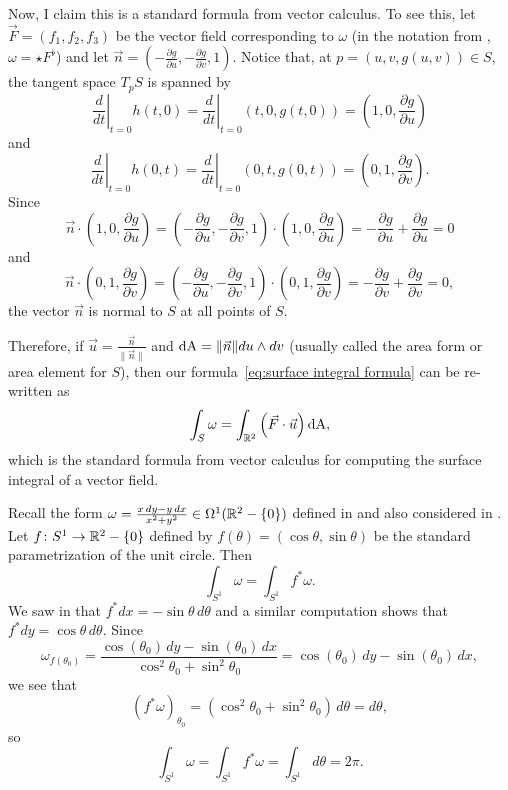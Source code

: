 \begin{example}
	Now, I claim this is a standard formula from vector calculus. To see this, let $\vec{F} = (f_1, f_2, f_3)$ be the vector field corresponding to $\omega$ (in the notation from , $\omega = \star F^\flat$) and let $\vec{n} = \left( -\frac{\partial g}{\partial u}, -\frac{\partial g}{\partial v}, 1\right)$. Notice that, at $p = (u,v,g(u,v)) \in S$, the tangent space $T_pS$ is spanned by
	\[
		\left. \frac{d}{dt} \right|_{t=0} h(t,0) = \left. \frac{d}{dt} \right|_{t=0} (t,0,g(t,0)) = \left( 1, 0 , \frac{\partial g}{\partial u} \right)
	\]
	and
	\[
		\left. \frac{d}{dt} \right|_{t=0} h(0,t) = \left. \frac{d}{dt} \right|_{t=0} (0,t,g(0,t)) = \left( 0,1 , \frac{\partial g}{\partial v} \right).
	\]
	Since
	\[
		\vec{n} \cdot \left( 1, 0 , \frac{\partial g}{\partial u} \right) = \left( -\frac{\partial g}{\partial u}, -\frac{\partial g}{\partial v}, 1\right) \cdot \left( 1, 0 , \frac{\partial g}{\partial u} \right) = -\frac{\partial g}{\partial u} + \frac{\partial g}{\partial u}  = 0
	\]
	and
	\[
		\vec{n} \cdot \left( 0,1 , \frac{\partial g}{\partial v} \right) = \left( -\frac{\partial g}{\partial u}, -\frac{\partial g}{\partial v}, 1\right) \cdot \left(0,1 , \frac{\partial g}{\partial v} \right) = -\frac{\partial g}{\partial v} + \frac{\partial g}{\partial v}  = 0,
	\]
	the vector $\vec{n}$ is normal to $S$ at all points of $S$. 
	
	Therefore, if $\vec{u} = \frac{\vec{n}}{\|\vec{n}\|}$ and $\operatorname{dA} = \|\vec{n}\| du \wedge dv$ (usually called the area form or area element for $S$), then our formula~\eqref{eq:surface integral formula} can be re-written as
	\[
		\int_S \omega = \int_{\mathbb{R}^2} \left(\vec{F} \cdot \vec{u}\right) \operatorname{dA},
	\]
	which is the standard formula from vector calculus for computing the surface integral of a vector field.
\end{example}

\begin{example}
	Recall the form $\omega = \frac{x \, dy - y \, dx}{x^2 + y^2} \in \Omega^1(\mathbb{R}^2 -\{0\})$ defined in  and also considered in . Let $f \colon\thinspace\! S^1 \to \mathbb{R}^2 -\{0\}$ defined by $f(\theta) = (\cos \theta , \sin \theta)$ be the standard parametrization of the unit circle. Then
	\[
		\int_{S^1} \omega = \int_{S^1} f^\ast \omega.
	\]
	We saw in  that $f^\ast dx = -\sin\theta\, d\theta$ and a similar computation shows that $f^\ast dy = \cos \theta\, d\theta$. Since
	\[
		\omega_{f(\theta_0)} = \frac{\cos(\theta_0) \, dy - \sin(\theta_0) \, dx}{\cos^2 \theta_0 + \sin^2\theta_0} = \cos(\theta_0) \, dy - \sin(\theta_0) \, dx,
	\]
	we see that
	\[
		(f^\ast \omega)_{\theta_0} = (\cos^2\theta_0 + \sin^2\theta_0)\, d\theta = d\theta,
	\]
	so
	\[
		\int_{S^1} \omega = \int_{S^1} f^\ast \omega = \int_{S^1} d\theta = 2\pi.
	\]
\end{example}

